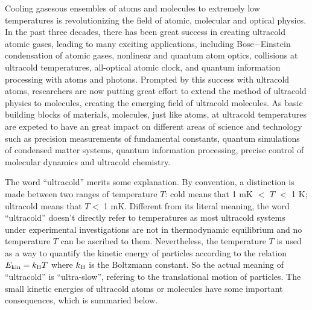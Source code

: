 Cooling gasesous ensembles of atoms and molecules to extremely low temperatures is  revolutionizing the 
field of atomic, molecular and optical physics. 
In the past three decades, there has been great success in creating ultracold atomic gases\cite{southwell2002, chu2002}, 
leading to many exciting applications,  
including Bose$-$Einstein condensation of atomic gases\cite{anglin2002}, nonlinear and quantum atom 
optics\cite{rolston2002}, collisions at ultracold temperatures\cite{burnett2002}, all-optical atomic
clock\cite{udem2002},
and quantum information processing with atoms and photons\cite{monroe2002}. 
Prompted by this success with 
ultracold atoms, researchers are now putting great effort to extend the method of ultracold physics to molecules,
creating the emerging field of ultracold molecules. 
As basic building blocks of materials, molecules,  just like atoms,  at ultracold temperatures are expeted to have  an great
impact on different areas of science and technology such as precision measurements of fundamental constants,  quantum simulations of condensed matter systems, quantum information processing, precise control of molecular
dynamics and ultracold chemistry\cite{our-njp-review, friedrich2009, schnell2009, Bell2009, krems2010cold, Ni2009,
Jin2011, Jin2012, quemener2012, Baranov2012}. 


The word ``ultracold'' merits some explanation. By convention, a distinction is made between two ranges of 
temperature $T$: cold means that 1 mK $<$ $T$ $<$ 1 K; ultracold means that $T < $ 1 mK.   Different from its literal 
meaning, the word  ``ultracold'' doesn't directly 
refer to temperatures  as most ultracold systems under experimental investigations are not in thermodynamic 
equilibrium and no temperature $T$ can be ascribed to them.  Nevertheless, the temperature $T$ is used as a way to 
quantify the kinetic energy of particles according to the relation $E_{\rm kin} = k_{\rm B} T$ where $k_{\rm B}$ is the 
Boltzmann constant.   So the actual meaning of ``ultracold'' is ``ultra-slow'', refering to the translational motion of 
particles.  
The small kinetic energies of  ultracold atoms or molecules have some important consequences, which is summaried below.

